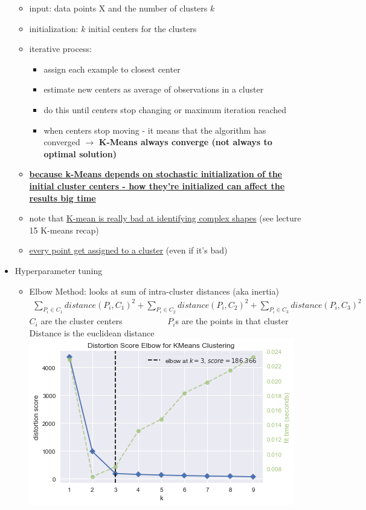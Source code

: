 \documentclass[10.5pt,a4paper, fleqn, dvipsnames]{article}
\begin{document}
\begin{itemize}
        \begin{itemize}
            \item input: data points X and the number of clusters $k$
            \item initialization: $k$ initial centers for the clusters
            \item iterative process: 
            \begin{itemize}[leftmargin = 2em]
                \item assign each example to closest center 
                \item estimate new centers as average of observations in a cluster 
                \item do this until centers stop changing or maximum iteration reached 
                \item when centers stop moving - it means that the algorithm has converged $\longrightarrow$ \textbf{K-Means always converge (not always to optimal solution)}
            \end{itemize}
            \item \ul{\textbf{because k-Means depends on stochastic initialization of the initial cluster centers - how they're initialized can affect the results big time}}
            \item note that \ul{K-mean is really bad at identifying complex shapes} (see lecture 15 K-means recap)
            \item \ul{every point get assigned to a cluster} (even if it's bad)
        \end{itemize}
    \item Hyperparameter tuning 
    \begin{itemize}
        \item Elbow Method: looks at sum of intra-cluster distances (aka inertia)
        \begin{align*}
            \sum_{P_i \in C_1}  distance(P_i, C_1)^2 + \sum_{P_i \in C_2}  distance(P_i, C_2)^2 + \sum_{P_i \in C_3} distance(P_i, C_3)^2
        \end{align*}
        $C_i$ are the cluster centers ~~~~~~~~~~$P_i$s are the points in that cluster \\
        Distance is the euclidean distance \\
        \includegraphics[scale = 0.7]{elbow-plot.png}

\end{itemize}
\end{itemize}
\end{document}
